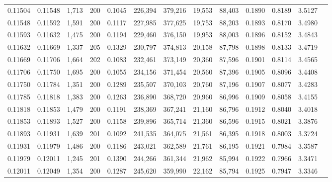 \begin{tabular}{rrrrrrrrrrrrr}
0.11504 & 0.11548 & 1,713 & 200 &                                     0.1045 & 226,394 & 379,216 &  19,553 &  88,403 & 0.1890 & 0.8189 & 3.5127 \\
0.11548 & 0.11592 & 1,591 & 200 &                                     0.1117 & 227,985 & 377,625 &  19,753 &  88,203 & 0.1893 & 0.8170 & 3.4980 \\
0.11593 & 0.11632 & 1,475 & 200 &                                     0.1194 & 229,460 & 376,150 &  19,953 &  88,003 & 0.1896 & 0.8152 & 3.4843 \\
0.11632 & 0.11669 & 1,337 & 205 &                                     0.1329 & 230,797 & 374,813 &  20,158 &  87,798 & 0.1898 & 0.8133 & 3.4719 \\
0.11669 & 0.11706 & 1,664 & 202 &                                     0.1083 & 232,461 & 373,149 &  20,360 &  87,596 & 0.1901 & 0.8114 & 3.4565 \\
0.11706 & 0.11750 & 1,695 & 200 &                                     0.1055 & 234,156 & 371,454 &  20,560 &  87,396 & 0.1905 & 0.8096 & 3.4408 \\
0.11750 & 0.11784 & 1,351 & 200 &                                     0.1289 & 235,507 & 370,103 &  20,760 &  87,196 & 0.1907 & 0.8077 & 3.4283 \\
0.11785 & 0.11818 & 1,383 & 200 &                                     0.1263 & 236,890 & 368,720 &  20,960 &  86,996 & 0.1909 & 0.8058 & 3.4155 \\
0.11818 & 0.11853 & 1,479 & 200 &                                     0.1191 & 238,369 & 367,241 &  21,160 &  86,796 & 0.1912 & 0.8040 & 3.4018 \\
0.11853 & 0.11893 & 1,527 & 200 &                                     0.1158 & 239,896 & 365,714 &  21,360 &  86,596 & 0.1915 & 0.8021 & 3.3876 \\
0.11893 & 0.11931 & 1,639 & 201 &                                     0.1092 & 241,535 & 364,075 &  21,561 &  86,395 & 0.1918 & 0.8003 & 3.3724 \\
0.11931 & 0.11979 & 1,486 & 200 &                                     0.1186 & 243,021 & 362,589 &  21,761 &  86,195 & 0.1921 & 0.7984 & 3.3587 \\
0.11979 & 0.12011 & 1,245 & 201 &                                     0.1390 & 244,266 & 361,344 &  21,962 &  85,994 & 0.1922 & 0.7966 & 3.3471 \\
0.12011 & 0.12049 & 1,354 & 200 &                                     0.1287 & 245,620 & 359,990 &  22,162 &  85,794 & 0.1925 & 0.7947 & 3.3346 \\

\end{tabular}
